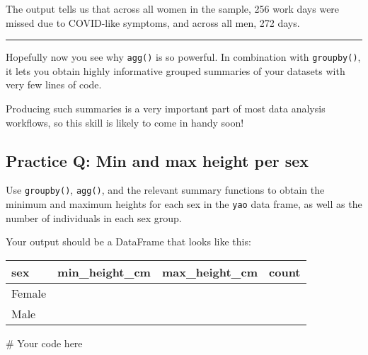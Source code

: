 \documentclass[
  letterpaper,
  DIV=11,
  numbers=noendperiod]{scrreprt}
\newenvironment{Shaded}{\begin{snugshade}}{\end{snugshade}}
\newcommand{\CommentTok}[1]{\textcolor[rgb]{0.37,0.37,0.37}{#1}}
\begin{document}
The output tells us that across all women in the sample, 256 work days
were missed due to COVID-like symptoms, and across all men, 272 days.

\begin{center}\rule{0.5\linewidth}{0.5pt}\end{center}

Hopefully now you see why \texttt{agg()} is so powerful. In combination
with \texttt{groupby()}, it lets you obtain highly informative grouped
summaries of your datasets with very few lines of code.

Producing such summaries is a very important part of most data analysis
workflows, so this skill is likely to come in handy soon!

\begin{tcolorbox}[enhanced jigsaw, colframe=quarto-callout-tip-color-frame, opacityback=0, titlerule=0mm, bottomrule=.15mm, breakable, leftrule=.75mm, colbacktitle=quarto-callout-tip-color!10!white, title=\textcolor{quarto-callout-tip-color}{\faLightbulb}\hspace{0.5em}{Practice}, rightrule=.15mm, coltitle=black, opacitybacktitle=0.6, colback=white, left=2mm, arc=.35mm, toptitle=1mm, bottomtitle=1mm, toprule=.15mm]

\subsection{Practice Q: Min and max height per
sex}\label{practice-q-min-and-max-height-per-sex}

Use \texttt{groupby()}, \texttt{agg()}, and the relevant summary
functions to obtain the minimum and maximum heights for each sex in the
\texttt{yao} data frame, as well as the number of individuals in each
sex group.

Your output should be a DataFrame that looks like this:

\begin{longtable}[]{@{}llll@{}}
\toprule\noalign{}
sex & min\_height\_cm & max\_height\_cm & count \\
\midrule\noalign{}
\endhead
\bottomrule\noalign{}
\endlastfoot
Female & & & \\
Male & & & \\
\end{longtable}

\begin{Shaded}
\begin{Highlighting}[]
\CommentTok{\# Your code here}
\end{Highlighting}
\end{Shaded}

\end{tcolorbox}
\end{document}
